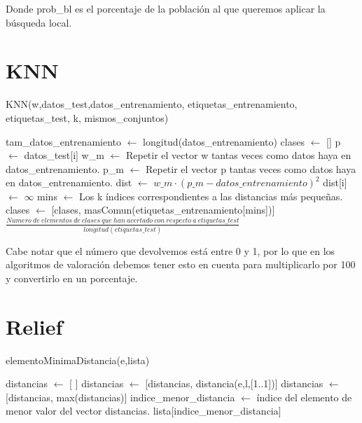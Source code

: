 \documentclass[12pt,a4paper]{article}
\begin{document}
	Donde prob\_bl es el porcentaje de la población al que queremos aplicar la búsqueda local.	
	
	\section{KNN}
	\label{sec:knn}
	
	\begin{algorithm}
		\caption{KNN(w,datos\_test,datos\_entrenamiento, etiquetas\_entrenamiento, etiquetas\_test, k, mismos\_conjuntos)}
		\begin{algorithmic}
			\STATE tam\_datos\_entrenamiento $\leftarrow$ longitud(datos\_entrenamiento)
			\STATE clases $\leftarrow$ []
			\STATE p $\leftarrow$ datos\_test[i]
			\STATE w\_m $\leftarrow$ Repetir el vector w tantas veces como datos haya en datos\_entrenamiento.
			\STATE p\_m $\leftarrow$ Repetir el vector p tantas veces como datos haya en datos\_entrenamiento.
			\STATE dist $\leftarrow$ $w\_m \cdot (p\_m - datos\_entrenamiento)^2$
			\STATE dist[i] $\leftarrow$ $\infty$
			\ENDIF
			\STATE mins $\leftarrow$ Los k índices correspondientes a las distancias más pequeñas.
			\STATE clases $\leftarrow$ [clases, masComun(etiquetas\_entrenamiento[mins])]
			\ENDFOR
			\RETURN $\frac{Numero \ de \ elementos \ de \ clases \ que \ han \ acertado \ con \ respecto \ a \ etiquetas\_test}{longitud(etiquetas\_test)}$
		\end{algorithmic}
	\end{algorithm}
	
	Cabe notar que el número que devolvemos está entre 0 y 1, por lo que en los algoritmos de valoración debemos tener esto en cuenta para multiplicarlo por 100 y convertirlo en un porcentaje.
	
	\section{Relief}
	\label{sec:relief}
	
	\begin{algorithm}
		\caption{elementoMinimaDistancia(e,lista)}
		\begin{algorithmic}
			\STATE distancias $\leftarrow$ [ ]
			\FOR{l en lista}
			\IF{l!=e}
			\STATE distancias $\leftarrow$ [distancias, distancia(e,l,[1..1])]
			\ELSE
			\STATE distancias $\leftarrow$ [distancias, max(distancias)]
			\ENDIF
			\ENDFOR
			\STATE indice\_menor\_distancia $\leftarrow$ índice del elemento de menor valor del vector distancias.
			\RETURN lista[indice\_menor\_distancia]
		\end{algorithmic}
	\end{algorithm}
	
\end{document}
